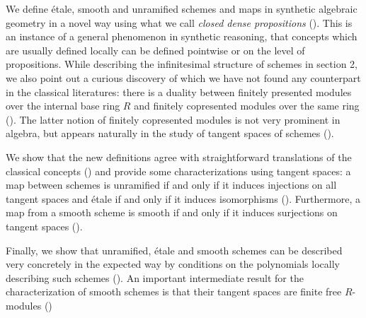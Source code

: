 We define étale, smooth and unramified schemes and maps in synthetic algebraic geometry in a novel way using what we call \emph{closed dense propositions} ().
This is an instance of a general phenomenon in synthetic reasoning, that concepts which are usually defined locally can be defined pointwise or on the level of propositions.
While describing the infinitesimal structure of schemes in section 2, we also point out a curious discovery of which we have not found any counterpart in the classical literatures: there is a duality between finitely presented modules over the internal base ring $R$ and finitely copresented modules over the same ring ().
The latter notion of finitely copresented modules is not very prominent in algebra, but appears naturally in the study of tangent spaces of schemes ().

We show that the new definitions agree with straightforward translations of the classical concepts () and provide some characterizations using tangent spaces:
a map between schemes is unramified if and only if it induces injections on all tangent spaces and étale if and only if it induces isomorphisms (). Furthermore, a map from a smooth scheme is smooth if and only if it induces surjections on tangent spaces ().

Finally, we show that unramified, étale and smooth schemes can be described very concretely in the expected way by conditions on the polynomials locally describing such schemes (). An important intermediate result for the characterization of smooth schemes is that their tangent spaces are finite free $R$-modules ()

